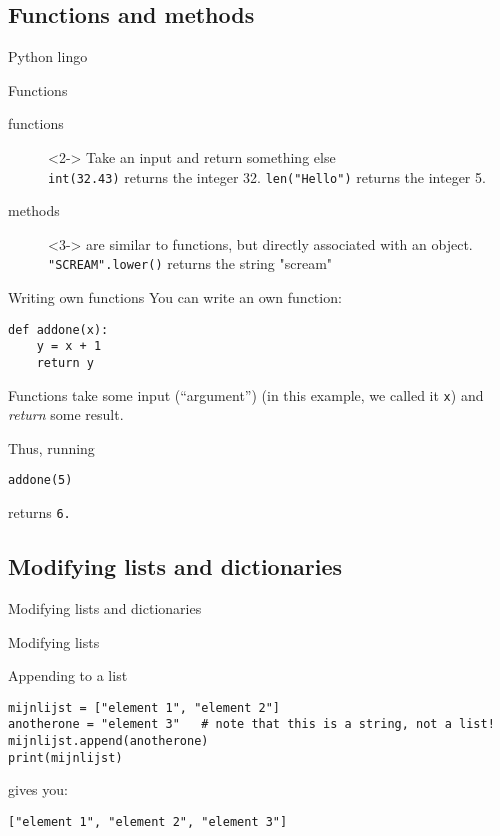 \documentclass{beamer}
\begin{document}
\subsection{Functions and methods}
\begin{frame}{Python lingo}
\begin{block}{Functions}
\begin{description}
\item[{\color{red}functions}]<2-> Take an input and return something else \\ {\tt{int(32.43})} returns the integer 32. \texttt{len("Hello")} returns the integer 5.\\ 
\item[{\color{red}methods}]<3-> are similar to functions, but directly associated with an object. {\tt{"SCREAM".lower()}} returns the string "scream"
\end{description}
\end{block}
\end{frame}


\begin{frame}[fragile]{Writing own functions}
You can write an own function:
\begin{lstlisting}
def addone(x):
    y = x + 1
    return y
\end{lstlisting}

Functions take some input (``argument'') (in this example, we called it \texttt{x}) and \emph{return} some result.
	
Thus, running
\begin{lstlisting}	
addone(5)
\end{lstlisting}
returns \tt{6}.
\end{frame}



\subsection{Modifying lists and dictionaries}

\begin{frame}[plain]
Modifying lists and dictionaries
\end{frame}{}
	
\begin{frame}[fragile]{Modifying lists}
\begin{block}{Appending to a list}
\begin{lstlisting}
mijnlijst = ["element 1", "element 2"]
anotherone = "element 3"   # note that this is a string, not a list!
mijnlijst.append(anotherone)
print(mijnlijst)
\end{lstlisting}
gives you:
\begin{lstlisting}
["element 1", "element 2", "element 3"]
\end{lstlisting}
\end{block}
\end{frame}
\end{document}
